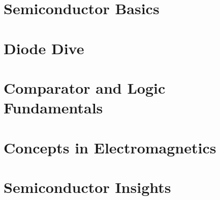 \documentclass[12pt]{book}
\begin{document}
\section{Semiconductor Basics}












\section{Diode Dive}











\section{Comparator and Logic Fundamentals}











\section{Concepts in Electromagnetics}












\section{Semiconductor Insights}












\end{document}
